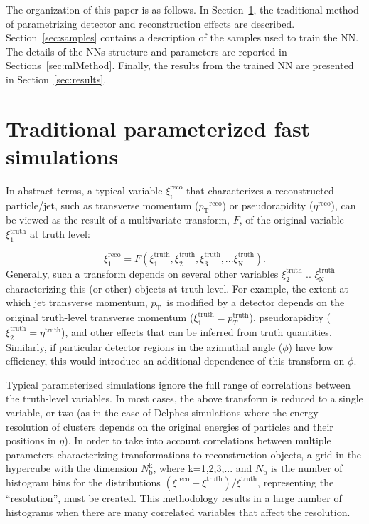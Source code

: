 \documentclass[showpacs,showkeys,preprint,prd,nofootinbib,linenumbers,12pt,superscriptaddress]{revtex4-1}
\def\pt{\ensuremath{p_{\mathrm{T}}}}
\def\genRes{\ensuremath{(\xi^{\mathrm{reco}}-\xi^{\mathrm{truth}})/\xi^{\mathrm{truth}}}}
\begin{document}
The organization of this paper is as follows. In Section~\ref{sec:tradMethod}, the traditional method of parametrizing detector and reconstruction effects are described. Section~\ref{sec:samples} contains a description of the samples used to train the NN. The details of the NNs structure and parameters are reported in Sections~\ref{sec:mlMethod}. Finally, the results from the trained NN are presented in Section~\ref{sec:results}.
\FloatBarrier

\section{Traditional parameterized fast simulations}
\label{sec:tradMethod}
In abstract terms, a typical variable $\xi_i^{\mathrm{reco}}$ that characterizes a reconstructed particle/jet, such as transverse momentum (\pt$^{\mathrm{reco}}$) or pseudorapidity ($\eta^{\mathrm{reco}}$), can be viewed as the result of a multivariate transform, $F$, of the original variable $\xi_1^{\mathrm{truth}}$ at truth level:

$$
\xi_1^{\mathrm{reco}} = F (\xi_1^{\mathrm{truth}}, \xi_2^{\mathrm{truth}}, \xi_3^{\mathrm{truth}}, ...\xi_{\mathrm{N}}^{\mathrm{truth}}).
$$
Generally, such a transform  depends on several other variables $\xi_2^{\mathrm{truth}}$ ..  $\xi_{\mathrm{N}}^{\mathrm{truth}}$ characterizing this (or other) objects at truth level. For example, the extent at which jet transverse momentum, \pt\ is modified by a detector depends on the original truth-level transverse momentum ($\xi_1^{\mathrm{truth}}=p_T^{\mathrm{truth}}$), pseudorapidity ($\xi_2^{\mathrm{truth}}=\eta^{\mathrm{truth}}$), and other effects that can be inferred from truth quantities. Similarly, if particular detector regions in the azimuthal angle ($\phi$) have low efficiency, this would introduce an additional dependence of this transform on $\phi$.

Typical parameterized simulations ignore the full range of correlations between the truth-level variables. In most cases, the above transform is reduced to a single variable, or two (as in the case of Delphes simulations where the energy resolution of clusters depends on the original energies of particles and their positions in $\eta$). In order to take into account correlations between multiple parameters characterizing transformations to reconstruction objects, a grid in the hypercube with the dimension $N_{\mathrm{b}}^{\mathrm{k}}$, where k=1,2,3,... and $N_{\mathrm{b}}$ is the number of histogram bins for the distributions \genRes, representing the ``resolution'', must be created. This methodology results in a large number of histograms when there are many correlated variables that affect the resolution.
\end{document}
